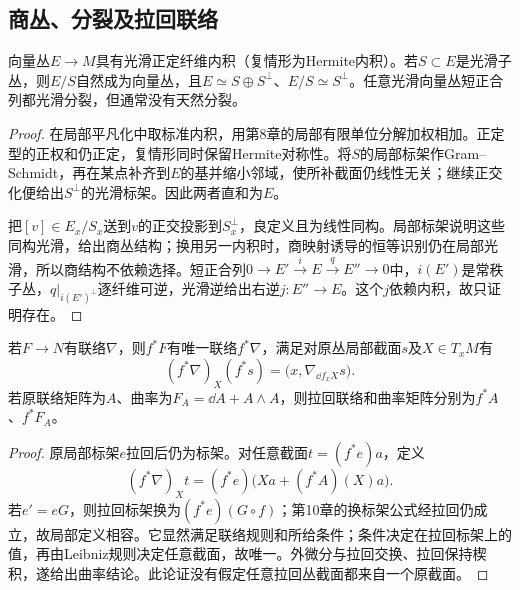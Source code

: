 \subsection{商丛、分裂及拉回联络}
\begin{proposition}\label{prop:bundle-split}
向量丛$E\to M$具有光滑正定纤维内积（复情形为Hermite内积）。若$S\subset E$是光滑子丛，则$E/S$自然成为向量丛，且$E\simeq S\oplus S^\perp$、$E/S\simeq S^\perp$。任意光滑向量丛短正合列都光滑分裂，但通常没有天然分裂。
\end{proposition}
\begin{proof}
在局部平凡化中取标准内积，用第8章的局部有限单位分解加权相加。正定型的正权和仍正定，复情形同时保留Hermite对称性。将$S$的局部标架作Gram--Schmidt，再在某点补齐到$E$的基并缩小邻域，使所补截面仍线性无关；继续正交化便给出$S^\perp$的光滑标架。因此两者直和为$E$。

把$[v]\in E_x/S_x$送到$v$的正交投影到$S_x^\perp$，良定义且为线性同构。局部标架说明这些同构光滑，给出商丛结构；换用另一内积时，商映射诱导的恒等识别仍在局部光滑，所以商结构不依赖选择。短正合列$0\to E'\xrightarrow{i}E\xrightarrow{q}E''\to0$中，$i(E')$是常秩子丛，$q|_{i(E')^\perp}$逐纤维可逆，光滑逆给出右逆$j:E''\to E$。这个$j$依赖内积，故只证明存在。
\end{proof}

\begin{proposition}\label{prop:bundle-pullback-connection}
若$F\to N$有联络$\nabla$，则$f^*F$有唯一联络$f^*\nabla$，满足对原丛局部截面$s$及$X\in T_xM$有
\[
 (f^*\nabla)_X(f^*s)=\bigl(x,\nabla_{\dd f_xX}s\bigr).
\]
若原联络矩阵为$A$、曲率为$F_A=\dd A+A\wedge A$，则拉回联络和曲率矩阵分别为$f^*A$、$f^*F_A$。
\end{proposition}
\begin{proof}
原局部标架$e$拉回后仍为标架。对任意截面$t=(f^*e)a$，定义
\[
 (f^*\nabla)_Xt=(f^*e)\bigl(Xa+(f^*A)(X)a\bigr).
\]
若$e'=eG$，则拉回标架换为$(f^*e)(G\circ f)$；第10章的换标架公式经拉回仍成立，故局部定义相容。它显然满足联络规则和所给条件；条件决定在拉回标架上的值，再由Leibniz规则决定任意截面，故唯一。外微分与拉回交换、拉回保持楔积，遂给出曲率结论。此论证没有假定任意拉回丛截面都来自一个原截面。
\end{proof}
